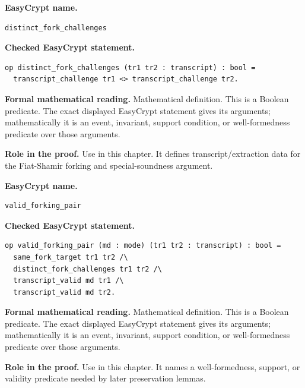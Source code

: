 \begin{formaldefinition}
\noindent\textbf{EasyCrypt name.}
\begin{lstlisting}[language=EasyCrypt,basicstyle=\ttfamily\scriptsize]
distinct_fork_challenges
\end{lstlisting}
\noindent\textbf{Checked EasyCrypt statement.}
\begin{lstlisting}[language=EasyCrypt,basicstyle=\ttfamily\scriptsize]
op distinct_fork_challenges (tr1 tr2 : transcript) : bool =
  transcript_challenge tr1 <> transcript_challenge tr2.
\end{lstlisting}
\noindent\textbf{Formal mathematical reading.}
Mathematical definition. This is a Boolean predicate.  The exact displayed EasyCrypt statement gives its arguments; mathematically it is an event, invariant, support condition, or well-formedness predicate over those arguments.

\noindent\textbf{Role in the proof.}
Use in this chapter. It defines transcript/extraction data for the Fiat-Shamir forking and special-soundness argument.

\end{formaldefinition}

\begin{formaldefinition}
\noindent\textbf{EasyCrypt name.}
\begin{lstlisting}[language=EasyCrypt,basicstyle=\ttfamily\scriptsize]
valid_forking_pair
\end{lstlisting}
\noindent\textbf{Checked EasyCrypt statement.}
\begin{lstlisting}[language=EasyCrypt,basicstyle=\ttfamily\scriptsize]
op valid_forking_pair (md : mode) (tr1 tr2 : transcript) : bool =
  same_fork_target tr1 tr2 /\
  distinct_fork_challenges tr1 tr2 /\
  transcript_valid md tr1 /\
  transcript_valid md tr2.
\end{lstlisting}
\noindent\textbf{Formal mathematical reading.}
Mathematical definition. This is a Boolean predicate.  The exact displayed EasyCrypt statement gives its arguments; mathematically it is an event, invariant, support condition, or well-formedness predicate over those arguments.

\noindent\textbf{Role in the proof.}
Use in this chapter. It names a well-formedness, support, or validity predicate needed by later preservation lemmas.

\end{formaldefinition}

